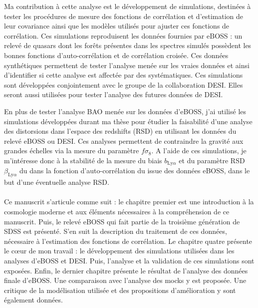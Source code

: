 Ma contribution à cette analyse est le développement de simulations, destinées à tester les procédures de mesure des fonctions de corrélation et d'estimation de leur covariance ainsi que les modèles utilisés pour ajuster ces fonctions de corrélation.
Ces simulations reproduisent les données fournies par eBOSS : un relevé de quasars dont les forêts \lya{} présentes dans les spectres simulés possèdent les bonnes fonctions d'auto-corrélation et de corrélation croisée.
Ces données synthétiques permettent de tester l'analyse menée sur les vraies données et ainsi d'identifier si cette analyse est affectée par des systématiques.
Ces simulations sont développées conjointement avec le groupe \lya{} de la collaboration DESI. Elles seront aussi utilisées pour tester l'analyse des futures données de DESI.

En plus de tester l'analyse BAO menée sur les données d'eBOSS, j'ai utilisé les simulations développées durant ma thèse pour étudier la faisabilité d'une analyse des distorsions dans l'espace des redshifts (RSD) en utilisant les données \lya{} du relevé eBOSS ou DESI.
Ces analyses permettent de contraindre la gravité aux grandes échelles via la mesure du paramètre $f \sigma_8$. A l'aide de ces simulations, je m'intéresse donc à la stabilité de la mesure du biais $b_{\mathrm{Ly}\alpha}$ et du paramètre RSD $\beta_{\mathrm{Ly}\alpha}$ du \lya{} dans la fonction d'auto-corrélation du \lya{} issue des données eBOSS, dans le but d'une éventuelle analyse RSD.

\paragraph{}
Ce manuscrit s'articule comme suit : le chapitre premier est une introduction à la cosmologie moderne et aux éléments nécessaires à la compréhension de ce manuscrit.
Puis, le relevé eBOSS  qui fait partie de la troisième génération de SDSS est présenté.
S'en suit la description du traitement de ces données, nécessaire à l'estimation des fonctions de corrélation.
Le chapitre quatre présente le cœur de mon travail : le développement des simulations utilisées dans les analyses \lya{} d'eBOSS et DESI.
Puis, l'analyse et la validation de ces simulations sont exposées.
Enfin, le dernier chapitre présente le résultat de l'analyse des données finale d'eBOSS. Une comparaison avec l'analyse des mocks y est proposée.
Une critique de la modélisation utilisée et des propositions d'amélioration y sont également données.

% 
